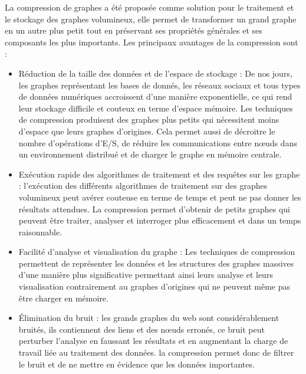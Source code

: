 La compression de graphes a été proposée comme solution pour le traitement et le stockage des graphes volumineux, elle permet de transformer un grand graphe en un autre plus petit tout en préservant ses propriétés générales et ses composants les plus importants.
Les principaux avantages de la compression sont  \citep{liu2018graph} :
\begin{itemize}

\item Réduction de la taille des données et de l'espace de stockage : De nos jours, les graphes représentant les bases de donnés, les réseaux sociaux et tous types de données numériques accroissent d'une manière exponentielle, ce qui rend leur stockage difficile et couteux en terme d'espace mémoire. Les techniques de compression produisent des graphes plus petits qui nécessitent moins d'espace que leurs graphes d'origines. Cela permet aussi de décroitre le nombre d'opérations d'E/S, de réduire les communications entre nœuds dans un environnement distribué et de charger le graphe en mémoire centrale.   

\item Exécution rapide des algorithmes de traitement et des requêtes sur les graphe : l'exécution des différents algorithmes de traitement sur des graphes volumineux peut avérer couteuse en terme de temps et peut ne pas donner les résultats attendues. La compression permet d'obtenir de petits graphes qui peuvent être traiter, analyser et interroger plus efficacement et dans un temps raisonnable. 
  
\item Facilité d'analyse et visualisation du graphe : Les techniques de compression permettent de représenter les données et les structures des graphes massives d'une manière plus significative permettant ainsi leurs analyse et leurs visualisation contrairement au graphes d'origines qui ne peuvent même pas être charger en mémoire.  

\item Élimination du bruit : les grands graphes du web sont considérablement bruités, ils contiennent des liens et des nœuds erronés, ce bruit peut perturber l'analyse en faussant les résultats et en augmentant la charge de travail liée au traitement des données. la compression permet donc de filtrer le bruit et de ne mettre en évidence que les données importantes.

\end{itemize}


